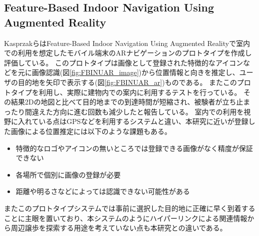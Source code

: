 \subsection{Feature-Based Indoor Navigation Using Augmented Reality}
KasprzakらはFeature-Based Indoor Navigation Using Augmented Reality\cite{6597797}で室内での利用を想定したモバイル端末のARナビゲーションのプロトタイプを作成し評価している。
このプロトタイプは画像として登録された特徴的なアイコンなどを元に画像認識(図\ref{fig:FBINUAR_image})から位置情報と向きを推定し、ユーザの目的地を矢印で表示する(図\ref{fig:FBINUAR_ar})ものである。
またこのプロトタイプを利用し、実際に建物内での案内に利用するテストを行っている。
その結果2Dの地図と比べて目的地までの到達時間が短縮され、被験者が立ち止まったり間違えた方向に進む回数も減少したと報告している。
室内での利用を視野に入れている点はGPSなどを利用するシステムと違い、本研究に近いが登録した画像による位置推定には以下のような課題もある。
\begin{itemize}
  \item 特徴的なロゴやアイコンの無いところでは登録できる画像がなく精度が保証できない
  \item 各場所で個別に画像の登録が必要
  \item 距離や明るさなどによっては認識できない可能性がある
\end{itemize}
またこのプロトタイプシステムでは事前に選択した目的地に正確に早く到着することに主眼を置いており、本システムのようにハイパーリンクによる関連情報から周辺譲歩を探索する用途を考えていない点も本研究との違いである。

